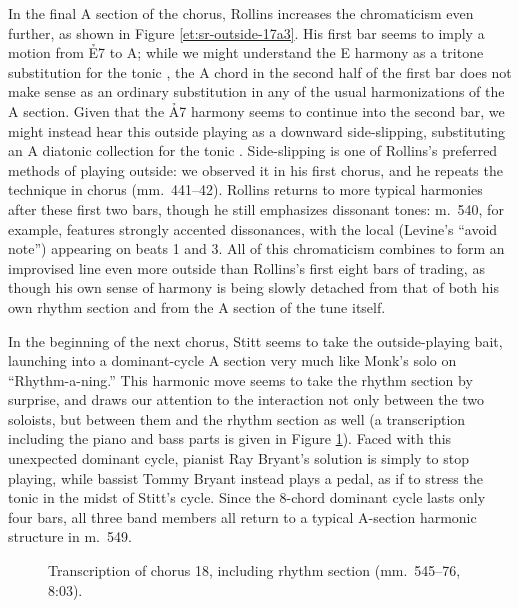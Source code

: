 In the final A section of the chorus, Rollins increases the chromaticism even
further, as shown in Figure \ref{et:sr-outside-17a3}. His first bar seems to
imply a motion from \h{E7} to A; while we might understand the E harmony as a
tritone substitution for the tonic \Bflat, the A chord in the second half of
the first bar does not make sense as an ordinary substitution in any of the
usual harmonizations of the A section. Given that the \h{A7} harmony seems to
continue into the second bar, we might instead hear this outside playing as a
downward side-slipping, substituting an A diatonic collection for the tonic
\Bflat. Side-slipping is one of Rollins's preferred methods of playing
outside: we observed it in his first chorus, and he repeats the
technique in chorus  (mm.~441--42). Rollins returns to more
typical harmonies after these first two bars, though he still emphasizes
dissonant tones: m.~540, for example, features strongly accented dissonances,
with the local  (Levine's ``avoid note'') appearing on beats 1 and 3. All
of this chromaticism combines to form an improvised line even more outside
than Rollins's first eight bars of trading, as though his own sense of harmony
is being slowly detached from that of both his own rhythm section and from the
A section of the tune itself.

In the beginning of the next chorus, Stitt seems to take the outside-playing
bait, launching into a dominant-cycle A section very much like Monk's solo on
``Rhythm-a-ning.'' This harmonic move seems to take the rhythm section by
surprise, and draws our attention to the interaction not only between the two
soloists, but between them and the rhythm section as well (a transcription
including the piano and bass parts is given in Figure
\ref{et:rhythm-sect-c18}). Faced with this unexpected dominant cycle, pianist
Ray Bryant's solution is simply to stop playing, while bassist Tommy Bryant
instead plays a \Bflat pedal, as if to stress the tonic in the midst of
Stitt's cycle. Since the 8-chord dominant cycle lasts only four bars, all
three band members all return to a typical A-section harmonic structure in m.~549.

\begin{figure}[p]
  \caption[Transcription of chorus 18, including rhythm section.]{%
    Transcription of chorus 18, including rhythm section (mm.~545--76, 8:03).}
  \label{et:rhythm-sect-c18}
\end{figure}

